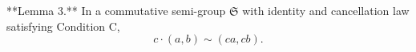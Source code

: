 **Lemma 3.** In a commutative semi-group $\mathfrak{S}$ with identity and cancellation law satisfying Condition C,
$$c \cdot (a, b) \sim (c a, c b).$$
